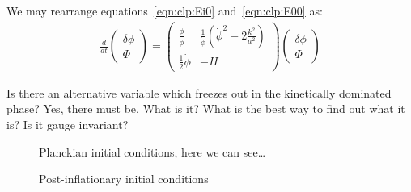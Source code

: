 We may rearrange equations~\eqref{eqn:clp:Ei0} and~\eqref{eqn:clp:E00} as:
\begin{align}
  \frac{d}{dt}
  \left(
  \begin{array}{c}
    \delta \phi \\
    \Phi
  \end{array}
  \right)
  =
  \left(%
  \begin{array}{cc}
    \frac{\ddot{\phi}}{\dot{\phi}} & \frac{1}{\dot{\phi}}\left( \dot{\phi}^2 - 2\frac{k^2}{a^2} \right) \\
    \frac{1}{2}\dot{\phi} & -H 
  \end{array}
  \right)
  \left(%
  \begin{array}{c}
    \delta \phi \\
    \Phi
  \end{array}
  \right)
\end{align}


Is there an alternative variable which freezes out in the kinetically dominated phase? Yes, there must be. What is it? What is the best way to find out what it is? Is it gauge invariant?

\ifdefined\lightweight
\else
\begin{figure}
  
  
  \caption{Planckian initial conditions, here we can see\ldots}
\end{figure}

\begin{figure}
  
  
  \caption{Post-inflationary initial conditions}
\end{figure}
\fi
